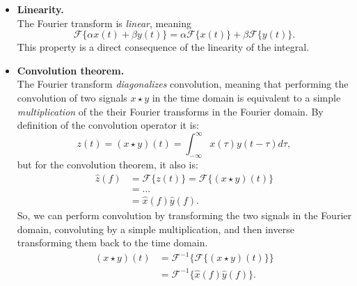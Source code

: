 \begin{itemize}
    \item \textbf{Linearity.}\\
    The Fourier transform is \emph{linear}, meaning
    \begin{equation}
        \mathcal{F} \{ \alpha x(t) + \beta y(t) \} = \alpha \mathcal{F} \{ x(t) \} + \beta \mathcal{F} \{ y(t) \}.
    \end{equation}
    This property is a direct consequence of the linearity of the integral.

    \item \textbf{Convolution theorem.}\\
    The Fourier transform \emph{diagonalizes} convolution, meaning that performing the convolution of two signals $x \star y$ in the time domain is equivalent to a simple \emph{multiplication} of the their Fourier transforms in the Fourier domain.
    By definition of the convolution operator it is:
    \begin{equation}
        z(t) = (x \star y)(t) = \int_{-\infty}^{\infty} x(\tau) y(t - \tau) d \tau,
    \end{equation}
    but for the convolution theorem, it also is:
    \begin{equation}
        \begin{aligned}
            \hat{z}(f) & = \mathcal{F}\{ z(t) \} = \mathcal{F}\{ (x \star y)(t) \} \\
            & = \dots \\
            & = \hat{x}(f) \hat{y}(f).
        \end{aligned}
    \end{equation}
    So, we can perform convolution by transforming the two signals in the Fourier domain, convoluting by a simple multiplication, and then inverse transforming them back to the time domain.
    \begin{equation}
        \begin{aligned}
            (x \star y)(t) & = \mathcal{F}^{-1} \{ \mathcal{F}\{ (x \star y)(t) \} \} \\
            & = \mathcal{F}^{-1} \{ \hat{x}(f) \hat{y}(f) \}.
        \end{aligned}
    \end{equation}
\end{itemize}